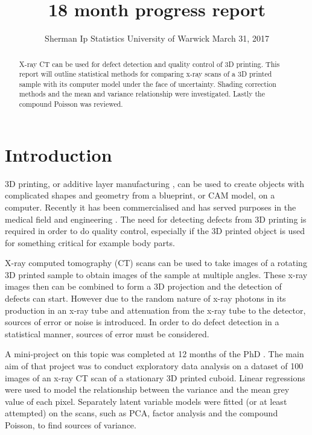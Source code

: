 \documentclass[a4paper]{proc}
\title{18 month progress report}
\author{Sherman Ip \quad Statistics \quad University of Warwick \quad March 31, 2017}
\begin{document}
\maketitle

\begin{abstract}
X-ray CT can be used for defect detection and quality control of 3D printing. This report will outline statistical methods for comparing x-ray scans of a 3D printed sample with its computer model under the face of uncertainty. Shading correction methods and the mean and variance relationship were investigated. Lastly the compound Poisson was reviewed.
\end{abstract}

\section{Introduction}
3D printing, or additive layer manufacturing \cite{kodama1981automatic}\cite{wong2012review}, can be used to create objects with complicated shapes and geometry from a blueprint, or CAM model, on a computer.  Recently it has been commercialised and has served purposes in the medical field \cite{kang20163d} and engineering \cite{wong2012review}. The need for detecting defects from 3D printing is required in order to do quality control, especially if the 3D printed object is used for something critical for example body parts. 

X-ray computed tomography (CT) \cite{hounsfield1980computed}\cite{michael2001x}\cite{cantatore2011introduction} scans can be used to take images of a rotating 3D printed sample to obtain images of the sample at multiple angles. These x-ray images then can be combined to form a 3D projection and the detection of defects can start. However due to the random nature of x-ray photons in its production in an x-ray tube and attenuation from the x-ray tube to the detector, sources of error or noise is introduced. In order to do defect detection in a statistical manner, sources of error must be considered.

A mini-project on this topic was completed at 12 months of the PhD \cite{ip2016inside}. The main aim of that project was to conduct exploratory data analysis on a dataset of 100 images of an x-ray CT scan of a stationary 3D printed cuboid. Linear regressions were used to model the relationship between the variance and the mean grey value of each pixel. Separately latent variable models were fitted (or at least attempted) on the scans, such as PCA, factor analysis and the compound Poisson, to find sources of variance.
\end{document}
